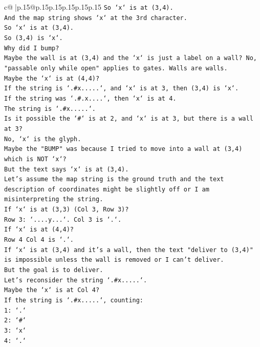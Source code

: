 \documentclass{article}
\begin{document}
{\begin{supertabular}{c@{$\;$}|p{.15\linewidth}@{}p{.15\linewidth}p{.15\linewidth}p{.15\linewidth}p{.15\linewidth}p{.15\linewidth}}
{{{\texttt{So `x` is at (3,4).} \\
\texttt{And the map string shows `x` at the 3rd character.} \\
\texttt{So `x` is at (3,4).} \\
\texttt{So (3,4) is `x`.} \\
\texttt{Why did I bump?} \\
\texttt{Maybe the wall is at (3,4) and the `x` is just a label on a wall? No, "passable only while open" applies to gates. Walls are walls.} \\
\texttt{Maybe the `x` is at (4,4)?} \\
\texttt{If the string is `.\#x.....`, and `x` is at 3, then (3,4) is `x`.} \\
\texttt{If the string was `.\#.x....`, then `x` is at 4.} \\
\texttt{The string is `.\#x.....`.} \\
\texttt{Is it possible the `\#` is at 2, and `x` is at 3, but there is a wall at 3?} \\
\texttt{No, `x` is the glyph.} \\
\texttt{Maybe the "BUMP" was because I tried to move into a wall at (3,4) which is NOT `x`?} \\
\texttt{But the text says `x` is at (3,4).} \\
\texttt{Let's assume the map string is the ground truth and the text description of coordinates might be slightly off or I am misinterpreting the string.} \\
\texttt{If `x` is at (3,3) (Col 3, Row 3)?} \\
\texttt{Row 3: `....y...`. Col 3 is `.`.} \\
\texttt{If `x` is at (4,4)?} \\
\texttt{Row 4 Col 4 is `.`.} \\
\texttt{If `x` is at (3,4) and it's a wall, then the text "deliver to (3,4)" is impossible unless the wall is removed or I can't deliver.} \\
\texttt{But the goal is to deliver.} \\
\texttt{Let's reconsider the string `.\#x.....`.} \\
\texttt{Maybe the `x` is at Col 4?} \\
\texttt{If the string is `.\#x.....`, counting:} \\
\texttt{1: `.`} \\
\texttt{2: `\#`} \\
\texttt{3: `x`} \\
\texttt{4: `.`} \\
}}}
\end{supertabular}}
\end{document}
